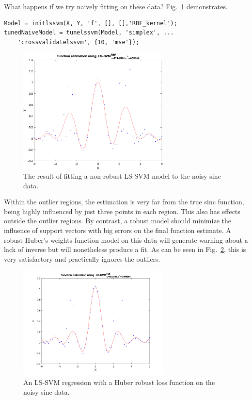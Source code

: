 \documentclass[10pt,a4paper]{article}
\begin{document}
What happens if we try naively fitting on these data? Fig.~\ref{fig:naiveNonRob} demonstrates.

\begin{lstlisting}[style=Matlab-editor, frame=single]
Model = initlssvm(X, Y, 'f', [], [],'RBF_kernel');
tunedNaiveModel = tunelssvm(Model, 'simplex', ...
    'crossvalidatelssvm', {10, 'mse'});
\end{lstlisting}

\begin{figure}[h!]
\centering
  \includegraphics[width=3in]{naiveNonRob.png}
  \caption{The result of fitting a non-robust LS-SVM model to the noisy sinc data.}
  \label{fig:naiveNonRob}
\end{figure}


Within the outlier regions, the estimation is very far from the true sinc function, being highly influenced by just three points in each region. This also has effects outside the outlier regions. 
By contrast, a robust model should minimize the influence of support vectors with big errors on the final function estimate. A robust Huber's weights function model on this data will generate warning about a lack of inverse but will nonetheless produce a fit. As can be seen in Fig.~\ref{fig:whuberRobust}, this is very satisfactory and practically ignores the outliers.

\begin{figure}[h!]
\centering
  \includegraphics[width=3in]{whuberRobust.png}
  \caption{An LS-SVM regression with a Huber robust loss function on the noisy sinc data.}
  \label{fig:whuberRobust}
\end{figure}
\end{document}
